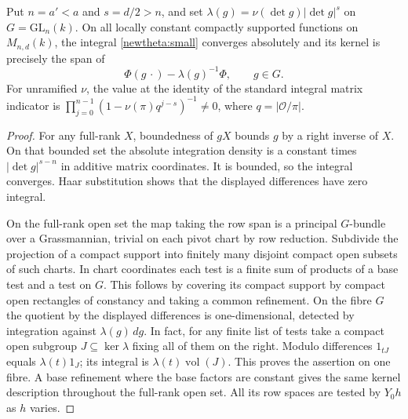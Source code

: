 \begin{proposition}\label{split:kernel}
Put \(n=a'<a\) and \(s=d/2>n\), and set
\(\lambda(g)=\nu(\det g)|\det g|^s\) on \(G=\mathrm{GL}_n(k)\).
On all locally constant compactly supported functions on \(M_{n,d}(k)\),
the integral \eqref{newtheta:small} converges absolutely and its kernel
is precisely the span of
\[
        \Phi(g\,\cdot)-\lambda(g)^{-1}\Phi,\qquad g\in G .
\]
For unramified \(\nu\), the value at the identity of the standard integral
matrix indicator is \(\prod_{j=0}^{n-1}(1-\nu(\pi)q^{j-s})^{-1}\ne0\),
where \(q=|\mathcal O/\pi|\).
\end{proposition}
\begin{proof}
For any full-rank \(X\), boundedness of \(gX\) bounds \(g\) by a right
inverse of \(X\). On that bounded set the absolute integration density
is a constant times \(|\det g|^{s-n}\) in additive matrix coordinates.
It is bounded, so the integral converges. Haar substitution shows that
the displayed differences have zero integral.

On the full-rank open set the map taking the row span is a principal
\(G\)-bundle over a Grassmannian, trivial on each pivot chart by
row reduction. Subdivide the projection of a compact support into
finitely many disjoint compact open subsets of such charts. In chart
coordinates each test is a finite sum of products of a base test and
a test on \(G\). This follows by covering its compact support by
compact open rectangles of constancy and taking a common refinement.
On the fibre \(G\) the quotient by the displayed differences is
one-dimensional, detected by integration against \(\lambda(g)\,dg\).
In fact, for any finite list of tests take a compact open subgroup
\(J\subseteq\ker\lambda\) fixing all of them on the right. Modulo
differences \(1_{tJ}\) equals \(\lambda(t)1_J\); its integral is
\(\lambda(t)\operatorname{vol}(J)\). This proves the assertion on one
fibre. A base refinement where the base factors are constant gives the
same kernel description throughout the full-rank open set. All its
row spaces are tested by \(Y_0h\) as \(h\) varies.


\end{proof}
